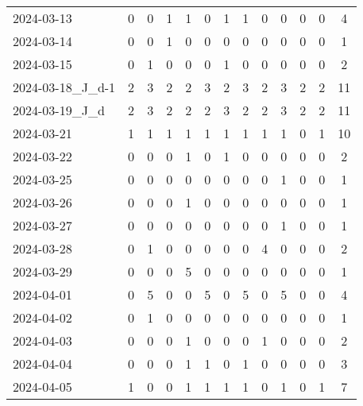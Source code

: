 \documentclass[dvipdfmx,oneside]{article}
\begin{document}
\begin{longtable}{lcccccccccccc}
        2024-03-13 &     0 &     0 &     1 &     1 &     0 &     1 &     1 &     0 &     0 &     0 &     0 &      4 \\
        2024-03-14 &     0 &     0 &     1 &     0 &     0 &     0 &     0 &     0 &     0 &     0 &     0 &      1 \\
        2024-03-15 &     0 &     1 &     0 &     0 &     0 &     1 &     0 &     0 &     0 &     0 &     0 &      2 \\
2024-03-18\_J\_d-1 &     2 &     3 &     2 &     2 &     3 &     2 &     3 &     2 &     3 &     2 &     2 &     11 \\
  2024-03-19\_J\_d &     2 &     3 &     2 &     2 &     2 &     3 &     2 &     2 &     3 &     2 &     2 &     11 \\
        2024-03-21 &     1 &     1 &     1 &     1 &     1 &     1 &     1 &     1 &     1 &     0 &     1 &     10 \\
        2024-03-22 &     0 &     0 &     0 &     1 &     0 &     1 &     0 &     0 &     0 &     0 &     0 &      2 \\
        2024-03-25 &     0 &     0 &     0 &     0 &     0 &     0 &     0 &     0 &     1 &     0 &     0 &      1 \\
        2024-03-26 &     0 &     0 &     0 &     1 &     0 &     0 &     0 &     0 &     0 &     0 &     0 &      1 \\
        2024-03-27 &     0 &     0 &     0 &     0 &     0 &     0 &     0 &     0 &     1 &     0 &     0 &      1 \\
        2024-03-28 &     0 &     1 &     0 &     0 &     0 &     0 &     0 &     4 &     0 &     0 &     0 &      2 \\
        2024-03-29 &     0 &     0 &     0 &     5 &     0 &     0 &     0 &     0 &     0 &     0 &     0 &      1 \\
        2024-04-01 &     0 &     5 &     0 &     0 &     5 &     0 &     5 &     0 &     5 &     0 &     0 &      4 \\
        2024-04-02 &     0 &     1 &     0 &     0 &     0 &     0 &     0 &     0 &     0 &     0 &     0 &      1 \\
        2024-04-03 &     0 &     0 &     0 &     1 &     0 &     0 &     0 &     1 &     0 &     0 &     0 &      2 \\
        2024-04-04 &     0 &     0 &     0 &     1 &     1 &     0 &     1 &     0 &     0 &     0 &     0 &      3 \\
        2024-04-05 &     1 &     0 &     0 &     1 &     1 &     1 &     1 &     0 &     1 &     0 &     1 &      7 \\

\end{longtable}
\end{document}
